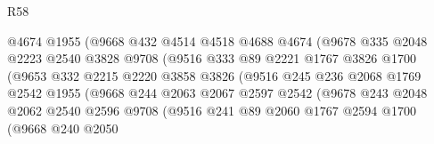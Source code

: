 \begin{lexlean}{R58}
\begin{coremodule}
                              @4674
                              @1955
                              (@9668
                                @432
                                @4514
                                @4518
                                @4688
                                @4674
                                (@9678
                                  @335
                                  @2048
                                  @2223
                                  @2540
                                  @3828
                                  @9708
                                  (@9516
                                    @333
                                    @89
                                    @2221
                                    @1767
                                    @3826
                                    @1700
                                    (@9653
                                      @332
                                      @2215
                                      @2220
                                      @3858
                                      @3826
                                      (@9516
                                        @245
                                        @236
                                        @2068
                                        @1769
                                        @2542
                                        @1955
                                        (@9668
                                          @244
                                          @2063
                                          @2067
                                          @2597
                                          @2542
                                          (@9678
                                            @243
                                            @2048
                                            @2062
                                            @2540
                                            @2596
                                            @9708
                                            (@9516
                                              @241
                                              @89
                                              @2060
                                              @1767
                                              @2594
                                              @1700
                                              (@9668
                                                @240
                                                @2050

\end{coremodule}
\end{lexlean}
